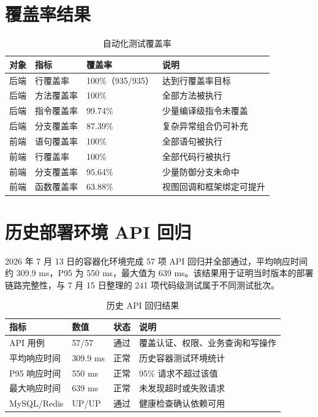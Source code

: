 \documentclass[UTF8,a4paper,12pt,openany,fontset=windows]{ctexrep}
\begin{document}
\section{覆盖率结果}
\begin{table}[H]
  \centering
  \caption{自动化测试覆盖率}
  \begin{tabularx}{\textwidth}{p{3.0cm}p{3.0cm}p{2.6cm}L}
    \toprule
    对象 & 指标 & 覆盖率 & 说明 \\
    \midrule
    后端 & 行覆盖率 & 100\%（935/935） & 达到行覆盖率目标 \\
    后端 & 方法覆盖率 & 100\% & 全部方法被执行 \\
    后端 & 指令覆盖率 & 99.74\% & 少量编译级指令未覆盖 \\
    后端 & 分支覆盖率 & 87.39\% & 复杂异常组合仍可补充 \\
    前端 & 语句覆盖率 & 100\% & 全部语句被执行 \\
    前端 & 行覆盖率 & 100\% & 全部代码行被执行 \\
    前端 & 分支覆盖率 & 95.64\% & 少量防御分支未命中 \\
    前端 & 函数覆盖率 & 63.88\% & 视图回调和框架绑定可提升 \\
    \bottomrule
  \end{tabularx}
\end{table}

\section{历史部署环境 API 回归}
2026 年 7 月 13 日的容器化环境完成 57 项 API 回归并全部通过，平均响应时间约 309.9 ms，P95 为 550 ms，最大值为 639 ms。该结果用于证明当时版本的部署链路完整性，与 7 月 15 日整理的 241 项代码级测试属于不同测试批次。

\begin{table}[H]
  \centering
  \caption{历史 API 回归结果}
  \begin{tabularx}{\textwidth}{p{3.1cm}p{2.6cm}p{2.6cm}L}
    \toprule
    指标 & 数值 & 状态 & 说明 \\
    \midrule
    API 用例 & 57/57 & 通过 & 覆盖认证、权限、业务查询和写操作 \\
    平均响应时间 & 309.9 ms & 正常 & 历史容器测试环境统计 \\
    P95 响应时间 & 550 ms & 正常 & 95\% 请求不超过该值 \\
    最大响应时间 & 639 ms & 正常 & 未发现超时或失败请求 \\
    MySQL/Redis & UP/UP & 通过 & 健康检查确认依赖可用 \\
    \bottomrule
  \end{tabularx}
\end{table}
\end{document}

